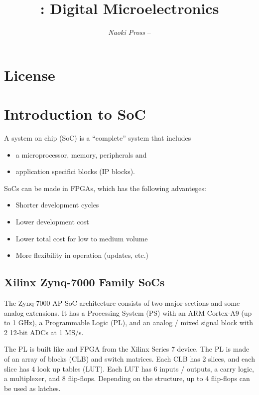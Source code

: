 \documentclass[margin=small]{tex/hsrzf}
\author{\textsl{Naoki Pross} -- \texttt{\theauthoremail}}
\title{\texttt{\themodule}: Digital Microelectronics}
\date{\thesemester}
\begin{document}
\maketitle
\tableofcontents

\section{License}
\doclicenseThis

\twocolumn
\setcounter{page}{1}

\section{Introduction to SoC}

A system on chip (SoC) is a ``complete'' system that includes
\begin{itemize}
  \item a microprocessor, memory, peripherals and
  \item application specifici blocks (IP blocks).
\end{itemize}
SoCs can be made in FPGAs, which has the following advanteges:
\begin{itemize}
  \item Shorter development cycles
  \item Lower development cost
  \item Lower total cost for low to medium volume
    \item More flexibility in operation (updates, etc.)
\end{itemize}

\subsection{Xilinx Zynq-7000 Family SoCs}

The Zynq-7000 AP SoC architecture consists of two major sections and some analog extensions. It has a Processing System (PS) with an ARM Cortex-A9 (up to 1 GHz), a Programmable Logic (PL), and an analog / mixed signal block with 2 12-bit ADCs at 1 MS/s.

The PL is built like and FPGA from the Xilinx Series 7 device. The PL is made of an array of blocks (CLB) and switch matrices. Each CLB has 2 slices, and each slice has 4 look up tables (LUT). Each LUT has 6 inputs / outputs, a carry logic, a multiplexer, and 8 flip-flops. Depending on the structure, up to 4 flip-flops can be used as latches.
\end{document}
